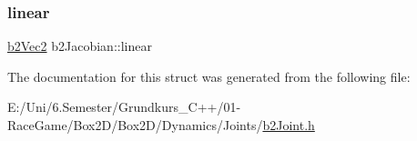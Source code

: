 \mbox{\label{structb2_jacobian_aa63199b443d411972b9cb6aac6c7cb34}} 
\subsubsection{\texorpdfstring{linear}{linear}}
{\footnotesize\ttfamily \mbox{\hyperlink{structb2_vec2}{b2\+Vec2}} b2\+Jacobian\+::linear}



The documentation for this struct was generated from the following file\+:\begin{DoxyCompactItemize}
\item 
E\+:/\+Uni/6.\+Semester/\+Grundkurs\+\_\+\+C++/01-\/\+Race\+Game/\+Box2\+D/\+Box2\+D/\+Dynamics/\+Joints/\mbox{\hyperlink{b2_joint_8h}{b2\+Joint.\+h}}\end{DoxyCompactItemize}

